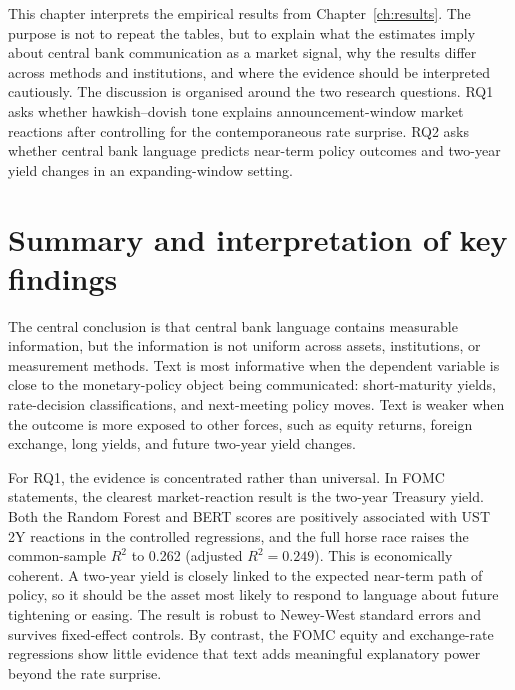 
This chapter interprets the empirical results from Chapter~\ref{ch:results}.
The purpose is not to repeat the tables, but to explain what the estimates imply
about central bank communication as a market signal, why the results differ
across methods and institutions, and where the evidence should be interpreted
cautiously. The discussion is organised around the two research questions. RQ1
asks whether hawkish--dovish tone explains announcement-window market reactions
after controlling for the contemporaneous rate surprise. RQ2 asks whether
central bank language predicts near-term policy outcomes and two-year yield
changes in an expanding-window setting.

\section{Summary and interpretation of key findings}
\label{sec:disc_summary}

The central conclusion is that central bank language contains measurable
information, but the information is not uniform across assets, institutions, or
measurement methods. Text is most informative when the dependent variable is
close to the monetary-policy object being communicated: short-maturity yields,
rate-decision classifications, and next-meeting policy moves. Text is weaker
when the outcome is more exposed to other forces, such as equity returns,
foreign exchange, long yields, and future two-year yield changes.

For RQ1, the evidence is concentrated rather than universal. In FOMC statements,
the clearest market-reaction result is the two-year Treasury yield. Both the
Random Forest and BERT scores are positively associated with UST 2Y
reactions in the controlled regressions, and the full horse race raises the
common-sample $R^2$ to 0.262 (adjusted $R^2 = 0.249$). This is economically
coherent. A two-year yield is closely linked to the expected near-term path of
policy, so it should be the asset most likely to respond to language about
future tightening or easing. The result is robust to Newey-West standard errors
and survives fixed-effect controls. By contrast, the FOMC equity and
exchange-rate regressions show little evidence that text adds meaningful
explanatory power beyond the rate surprise.

